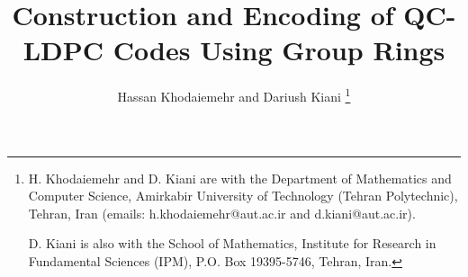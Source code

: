 \documentclass[journal,draftclsnofoot,onecolumn,12pt,twoside]{IEEEtran}
\begin{document}
%
\title{Construction and Encoding of QC-LDPC Codes Using Group Rings}
%
%
%



\author{Hassan Khodaiemehr and %
Dariush Kiani%
\thanks{H. Khodaiemehr and D. Kiani  are with the Department
of Mathematics and Computer Science, Amirkabir University of Technology (Tehran Polytechnic), Tehran, Iran (emails: h.khodaiemehr@aut.ac.ir and d.kiani@aut.ac.ir).

D. Kiani is also with the  School of Mathematics, Institute for Research in Fundamental Sciences (IPM), P.O. Box 19395-5746, Tehran, Iran.
}}%

%
%
\end{document}

